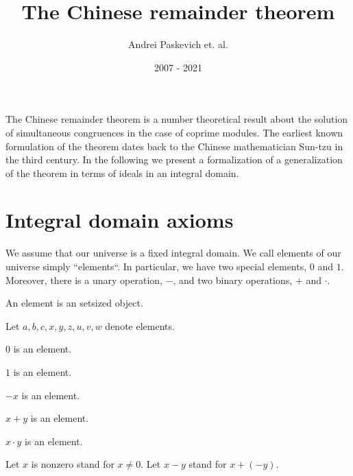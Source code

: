\documentclass{article}
\title{The Chinese remainder theorem}
\author{Andrei Paskevich et. al.}
\date{2007 - 2021}
\begin{document}
  \maketitle

  The Chinese remainder theorem is a number theoretical result about the solution of simultaneous congruences in the case of coprime modules. The earliest known formulation of the theorem dates back to the Chinese mathematician Sun-tzu in the third century. In the following we present a formalization of a generalization of the theorem in terms of ideals in an integral domain.


  \section{Integral domain axioms}

  We assume that our universe is a fixed integral domain. We call elements of our universe simply ``elements``. In particular, we have two special elements, $0$ and $1$. Moreover, there is a unary operation, $-$, and two binary operations, $+$ and $\cdot$.

  \begin{forthel}

    \begin{signature}[ElmSort]
      An element is an setsized object.
    \end{signature}

    Let $a,b,c,x,y,z,u,v,w$ denote elements.

    \begin{signature}[SortsC]
      $0$ is an element.
    \end{signature}

    \begin{signature}[SortsC]
      $1$ is an element.
    \end{signature}

    \begin{signature}[Sortsu]
      $-x$ is an element.
    \end{signature}

    \begin{signature}[SortsB]
      $x + y$ is an element.
    \end{signature}

    \begin{signature}[SortsB]
      $x \cdot y$ is an element.
    \end{signature}

    Let $x$ is nonzero stand for $x \neq 0$.
    Let $x - y$ stand for $x + (-y)$.
  \end{forthel}
\end{document}
